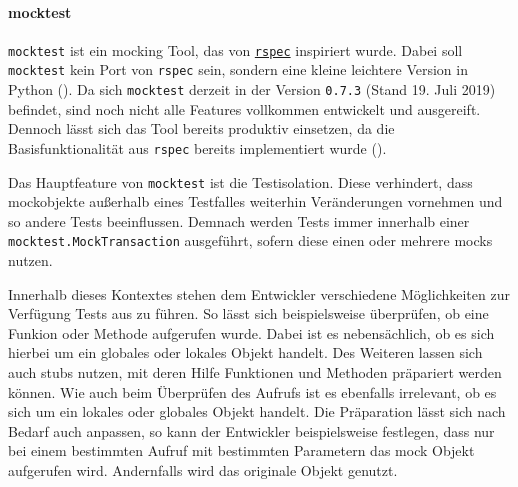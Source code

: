 \paragraph{mocktest}\label{python-tools:mocktest}\mbox{}
\newline
\lstinline{mocktest} ist ein \gls{mock}ing Tool, das von
\href{http://rspec.info/}{\lstinline{rspec}}
inspiriert wurde. Dabei soll \lstinline{mocktest} kein Port von
\lstinline{rspec} sein, sondern eine kleine leichtere
Version in Python (\cite{mocktest:doc}). Da sich \lstinline{mocktest} derzeit in
der Version \lstinline{0.7.3} (Stand 19. Juli 2019) befindet, sind noch nicht
alle Features vollkommen entwickelt und ausgereift. Dennoch lässt sich das Tool
bereits produktiv einsetzen, da die Basisfunktionalität aus
\lstinline{rspec} bereits implementiert wurde
(\cite{mocktest:doc}).
\newline

Das Hauptfeature von \lstinline{mocktest} ist die Testisolation. Diese
verhindert, dass \Gls{mock}objekte außerhalb eines Testfalles weiterhin
Veränderungen vornehmen und so andere Tests beeinflussen. Demnach werden Tests
immer innerhalb einer \lstinline{mocktest.MockTransaction} ausgeführt, sofern
diese einen oder mehrere \Glspl{mock} nutzen.

Innerhalb dieses Kontextes stehen dem Entwickler verschiedene Möglichkeiten zur
Verfügung Tests aus zu führen. So lässt sich beispielsweise überprüfen, ob eine
Funkion oder Methode aufgerufen wurde. Dabei ist es nebensächlich, ob es sich
hierbei um ein globales oder lokales Objekt handelt. Des Weiteren lassen sich
auch \Glspl{stub} nutzen, mit deren Hilfe Funktionen und Methoden präpariert
werden können. Wie auch beim Überprüfen des Aufrufs ist es ebenfalls irrelevant,
ob es sich um ein lokales oder globales Objekt handelt.
Die Präparation lässt sich nach Bedarf auch anpassen, so kann der Entwickler
beispielsweise festlegen, dass nur bei einem bestimmten Aufruf mit bestimmten
Parametern das \Gls{mock} Objekt aufgerufen wird. Andernfalls wird das originale
Objekt genutzt.
\newline

